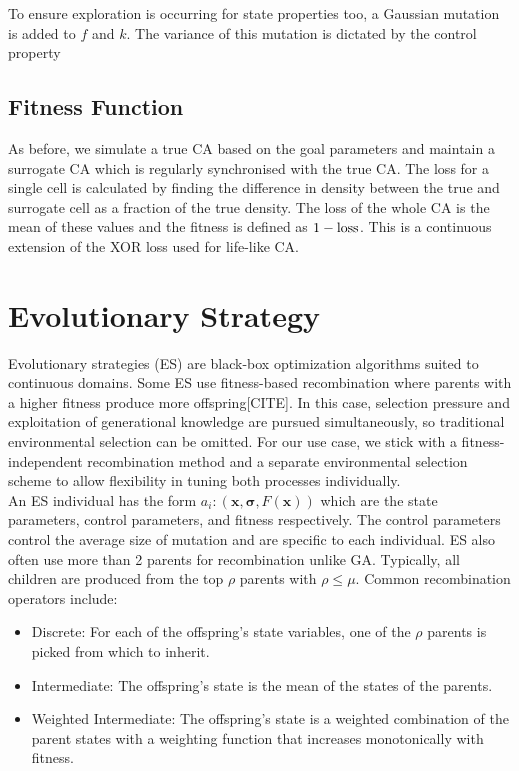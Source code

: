 To ensure exploration is occurring for state properties too, a Gaussian mutation is added to $f$ and $k$. The variance of this mutation is dictated by the control property 

\subsection{Fitness Function}
As before, we simulate a true CA based on the goal parameters and maintain a surrogate CA which is regularly synchronised with the true CA. The loss for a single cell is calculated by finding the difference in density between the true and surrogate cell as a fraction of the true density. The loss of the whole CA is the mean of these values and the fitness is defined as $1 - \textnormal{loss}$. This is a continuous extension of the XOR loss used for life-like CA.\\

\section{Evolutionary Strategy} \label{sec:es}
Evolutionary strategies (ES) are black-box optimization algorithms suited to continuous domains. Some ES use fitness-based recombination where parents with a higher fitness produce more offspring[CITE]. In this case, selection pressure and exploitation of generational knowledge are pursued simultaneously, so traditional environmental selection can be omitted. For our use case, we stick with a fitness-independent recombination method and a separate environmental selection scheme to allow flexibility in tuning both processes individually.\\

An ES individual has the form $a_i: (\bm{x}, \bm{\sigma}, F(\bm{x}))$ which are the state parameters, control parameters, and fitness respectively. The control parameters control the average size of mutation and are specific to each individual. ES also often use more than 2 parents for recombination unlike GA. Typically, all children are produced from the top $\rho$ parents with $\rho \leq \mu$. Common recombination operators include:
\begin{itemize}
  \item Discrete: For each of the offspring's state variables, one of the $\rho$ parents is picked from which to inherit.
  \item Intermediate: The offspring's state is the mean of the states of the parents.
  \item Weighted Intermediate: The offspring's state is a weighted combination of the parent states with a weighting function that increases monotonically with fitness.
\end{itemize}


